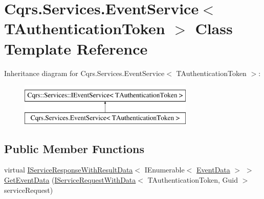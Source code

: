 \hypertarget{classCqrs_1_1Services_1_1EventService}{}\section{Cqrs.\+Services.\+Event\+Service$<$ T\+Authentication\+Token $>$ Class Template Reference}
\label{classCqrs_1_1Services_1_1EventService}
Inheritance diagram for Cqrs.\+Services.\+Event\+Service$<$ T\+Authentication\+Token $>$\+:\begin{figure}[H]
\begin{center}
\leavevmode
\includegraphics[height=2.000000cm]{classCqrs_1_1Services_1_1EventService}
\end{center}
\end{figure}
\subsection*{Public Member Functions}
\begin{DoxyCompactItemize}
\item 
virtual \hyperlink{interfaceCqrs_1_1Services_1_1IServiceResponseWithResultData}{I\+Service\+Response\+With\+Result\+Data}$<$ I\+Enumerable$<$ \hyperlink{classCqrs_1_1Events_1_1EventData}{Event\+Data} $>$ $>$ \hyperlink{classCqrs_1_1Services_1_1EventService_a9a68d774ac754e39be56d3e0449f14d7}{Get\+Event\+Data} (\hyperlink{interfaceCqrs_1_1Services_1_1IServiceRequestWithData}{I\+Service\+Request\+With\+Data}$<$ T\+Authentication\+Token, Guid $>$ service\+Request)
\end{DoxyCompactItemize}
